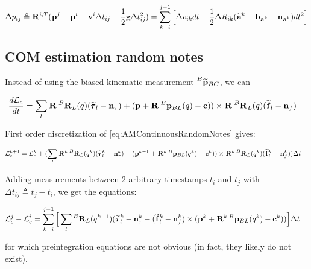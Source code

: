 \documentclass[11pt]{article}
\newcommand{\Rot}[2]{\prescript{#1}{}{\bfR}_{#2}}
\newcommand{\noise}{\bfn}
\newcommand{\posi}[2]{\prescript{#1}{}{\bfp}_{#2}}
\newcommand{\posim}[2]{\prescript{#1}{}{\widetilde{\bfp}}_{#2}}
\newcommand{\vel}[2]{\prescript{#1}{}{\bfv}_{#2}}
\newcommand{\acc}[2]{\prescript{#1}{}{\bfa}_{#2}}
\newcommand{\accm}[2]{\prescript{#1}{}{\widetilde{\bfa}}_{#2}}
\newcommand{\forcem}[2]{\prescript{#1}{}{\widetilde{\bff}}_{#2}}
\newcommand{\torquem}[2]{\prescript{#1}{}{\widetilde{\pmb{\tau}}}_{#2}}
\newcommand{\AM}{\mathcal{L}}
\newcommand{\COM}{\bfc}
\newcommand{\grav}{\bfg}
\begin{document}
\begin{equation}
    \Delta p_{ij} \triangleq \Rot{}{}^{i,T}(\posi{}{}^j - \posi{}{}^i - \vel{}{}^i \Delta t_{ij} - \frac{1}{2} \grav \Delta t_{ij}^2) = \sum_{k=i}^{j-1} \Big[\Delta v_{ik}dt +  \frac{1}{2} \Delta R_{ik} (\accm{}{}^k - \bfb_{\acc{}{}^k} - \noise_{\acc{}{}^k})dt^2 \Big]
\end{equation}


\subsection{COM estimation random notes}

Instead of using the biased kinematic measurement $\posim{B}{BC}$, we can 

\begin{equation}
\begin{split}
\frac{d\AM_c}{dt}&= \sum_l \Rot{}{}\Rot{B}{L}(q)(\torquem{}{l} - \noise_{\tau}) + (\bfp +
\Rot{}{}\posi{B}{BL}(q) - \COM)) \times \Rot{}{}\Rot{B}{L}(q)(\forcem{}{l} - \noise_f)
\end{split}
\label{eq:AMContinuousRandomNotes}
\end{equation}

First order discretization of \ref{eq:AMContinuousRandomNotes} gives:

\begin{equation}
\begin{split}
\AM_c^{k+1} &= \AM_c^{k} +  ( 
\sum_l \Rot{}{}^{k}\Rot{B}{L}(q^{k})(\torquem{}{l}^{k} - \noise_{\tau}^{k}) + (\bfp^{k-1} +
\Rot{}{}^{k}\posi{B}{BL}(q^{k}) - \COM^{k})) \times \Rot{}{}^{k}\Rot{B}{L}(q^{k})(\forcem{}{l}^{k} - \noise_f^{k}) 
) \Delta t
\end{split}
\end{equation}



Adding measurements between 2 arbitrary timestamps \(t_i\) and \(t_j\) with \(\Delta t_{ij} \triangleq t_j - t_i\), we get the equations:

\begin{equation}
\begin{split}
\AM_c^{j} - \AM_c^{i} &=  \sum_{k=i}^{j-1} \Big[ 
\sum_l \Rot{B}{L}(q^{k-1}) (\torquem{}{l}^{k} - \noise_{\tau}^{k} - (\forcem{}{l}^{k} - \noise_f^{k}) \times (\bfp^{k} + \Rot{}{}^{k}\posi{B}{BL}(q^{k}) - \COM^{k})) \Big]  \Delta t
\end{split}
\end{equation}


for which preintegration equations are not obvious (in fact, they likely do not exist).
\end{document}
